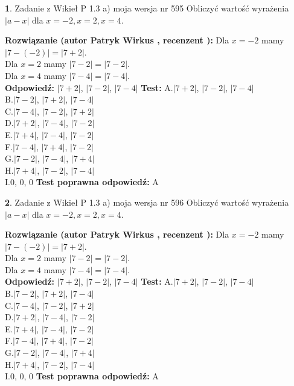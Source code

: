 \documentclass[12pt, a4paper]{article}
\theoremstyle{definition} %
\newtheorem{zad}{}
\newcommand{\zadStart}[1]{\begin{zad}#1\newline}
\newcommand{\zadStop}{\end{zad}}
\newcommand{\rozwStart}[2]{\noindent \textbf{Rozwiązanie (autor #1 , recenzent #2): }\newline}
\newcommand{\rozwStop}{\newline}
\newcommand{\odpStart}{\noindent \textbf{Odpowiedź:}\newline}
\newcommand{\odpStop}{\newline}
\newcommand{\testStart}{\noindent \textbf{Test:}\newline}
\newcommand{\testStop}{\newline}
\newcommand{\kluczStart}{\noindent \textbf{Test poprawna odpowiedź:}\newline}
\newcommand{\kluczStop}{\newline}
\begin{document}
\zadStart{Zadanie z Wikieł P 1.3 a) moja wersja nr 595}
Obliczyć wartość wyrażenia $|a - x|$ dla $x=-2,x=2,x=4$.
\zadStop
\rozwStart{Patryk Wirkus}{}
Dla $x = -2$ mamy $|7 - (-2)| = |7 + 2|$.\\
Dla $x = 2$ mamy $|7 - 2| = |7 - 2|$.\\
Dla $x = 4$ mamy $|7 - 4| = |7 - 4|$.\\
\rozwStop
\odpStart
$|7 + 2|$, $|7 - 2|$, $|7 - 4|$
\odpStop
\testStart
A.$|7 + 2|$, $|7 - 2|$, $|7 - 4|$\\
B.$|7 - 2|$, $|7 + 2|$, $|7 - 4|$\\
C.$|7 - 4|$, $|7 - 2|$, $|7 + 2|$\\
D.$|7 + 2|$, $|7 - 4|$, $|7 - 2|$\\
E.$|7 + 4|$, $|7 - 4|$, $|7 - 2|$\\
F.$|7 - 4|$, $|7 + 4|$, $|7 - 2|$\\
G.$|7 - 2|$, $|7 - 4|$, $|7 + 4|$\\
H.$|7 + 4|$, $|7 - 2|$, $|7 - 4|$\\
I.$0$, $0$, $0$
\testStop
\kluczStart
A
\kluczStop



\zadStart{Zadanie z Wikieł P 1.3 a) moja wersja nr 596}
Obliczyć wartość wyrażenia $|a - x|$ dla $x=-2,x=2,x=4$.
\zadStop
\rozwStart{Patryk Wirkus}{}
Dla $x = -2$ mamy $|7 - (-2)| = |7 + 2|$.\\
Dla $x = 2$ mamy $|7 - 2| = |7 - 2|$.\\
Dla $x = 4$ mamy $|7 - 4| = |7 - 4|$.\\
\rozwStop
\odpStart
$|7 + 2|$, $|7 - 2|$, $|7 - 4|$
\odpStop
\testStart
A.$|7 + 2|$, $|7 - 2|$, $|7 - 4|$\\
B.$|7 - 2|$, $|7 + 2|$, $|7 - 4|$\\
C.$|7 - 4|$, $|7 - 2|$, $|7 + 2|$\\
D.$|7 + 2|$, $|7 - 4|$, $|7 - 2|$\\
E.$|7 + 4|$, $|7 - 4|$, $|7 - 2|$\\
F.$|7 - 4|$, $|7 + 4|$, $|7 - 2|$\\
G.$|7 - 2|$, $|7 - 4|$, $|7 + 4|$\\
H.$|7 + 4|$, $|7 - 2|$, $|7 - 4|$\\
I.$0$, $0$, $0$
\testStop
\kluczStart
A
\kluczStop
\end{document}
